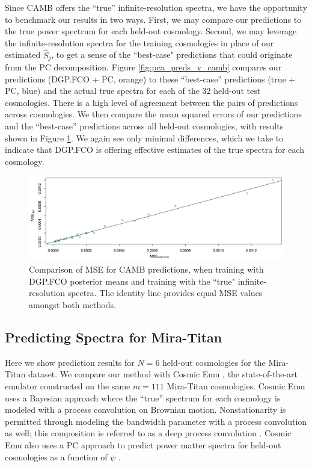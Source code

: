 \documentclass[11pt]{article}
\begin{document}
Since CAMB offers the ``true'' infinite-resolution spectra, we have the opportunity to benchmark our
results in two ways.  First, we may compare our predictions to the true power spectrum for each held-out
cosmology.  Second, we may leverage the infinite-resolution spectra for the training cosmologies in
place of our estimated $\hat{S}_j$, to get a sense of the ``best-case" predictions that could originate
from the PC decomposition.  Figure \ref{fig:pca_preds_v_camb} compares our predictions (DGP.FCO + PC, orange)
to these ``best-case'' predictions (true + PC, blue) and the actual true spectra for each of the 32
held-out test cosmologies.  There is a high level of agreement between the pairs of predictions across 
cosmologies. 
We then compare the mean squared errors of our predictions and the ``best-case'' 
predictions across all held-out cosmologies, with results shown in Figure \ref{fig:mse_camb}.  We again
see only minimal differences, which we take to indicate that DGP.FCO is offering effective
estimates of the true spectra for each cosmology.

\begin{figure}
    \centering
    \includegraphics[width=\textwidth]{mse_dot.jpeg}
    \caption{Comparison of MSE for CAMB predictions, when training with DGP.FCO posterior 
             means and training with the ``true" infinite-resolution spectra. The identity line 
             provides equal MSE values amongst both methods.}   
    \label{fig:mse_camb}
\end{figure}

\subsection{Predicting Spectra for Mira-Titan}
\label{subsec:mira_pred}

Here we show prediction results for $N=6$ held-out cosmologies for the Mira-Titan dataset. 
We compare our method with Cosmic Emu \citep{moran2023mira}, the state-of-the-art emulator 
constructed on the same $m=111$ Mira-Titan cosmologies. Cosmic Emu uses a Bayesian approach 
where the ``true'' spectrum for each cosmology is modeled with a process convolution on Brownian motion. 
Nonstationarity is permitted through modeling the bandwidth parameter with a process 
convolution as well; this composition is referred to as a deep process convolution 
\citep[DPC,][]{moran2023mira}. Cosmic Emu also uses a PC approach to predict power matter 
spectra for held-out cosmologies as a function of $\psi$ \citep{gattiker2020sepia}.
\end{document}
